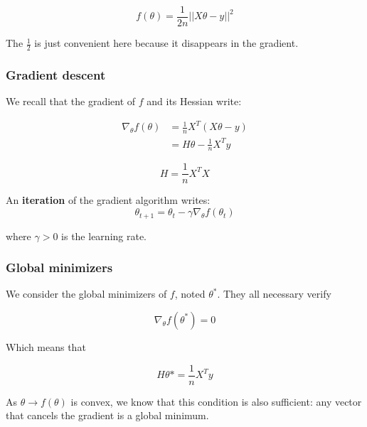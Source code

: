 \documentclass[
10pt, %
a4paper, %
oneside, %
headinclude,footinclude, %
BCOR5mm, %
]{scrartcl}
\begin{document}
\begin{equation}
    f( \theta) = \frac{1}{2n} || X \theta - y||^2
\end{equation}

The $ \frac{1}{2}$ is just convenient here because it disappears in the gradient.

\subsubsection{Gradient descent}

We recall that the gradient of $f$ and its Hessian write:

    \begin{equation}
	\begin{aligned}
	    \label{eq:}
        \nabla_{\theta}f(\theta) &=  \frac{1}{n} X^T(X\theta-y)\\
	    &= H \theta - \frac{1}{n} X^Ty
	\end{aligned}
    \end{equation}

    \begin{equation}
        H = \frac{1}{n} X^TX
    \end{equation}

An \textbf{iteration} of the gradient algorithm writes:
\begin{equation}
    \theta_{t+1} = \theta_{t}- \gamma \nabla_{\theta}f(\theta_t)
\end{equation}

where $\gamma>0$ is the learning rate.

\subsubsection{Global minimizers}

We consider the global minimizers of $f$, noted $\theta^*$. They all necessary verify

    \begin{equation}
        \nabla_{\theta}f(\theta^*) = 0
    \end{equation}

    Which means that 

    \begin{equation}
        H\theta* = \frac{1}{n} X^Ty
    \end{equation}

    As $\theta\rightarrow f(\theta)$ is convex, we know that this
    condition is also sufficient: any vector that cancels the gradient is a global
    minimum.
\end{document}
